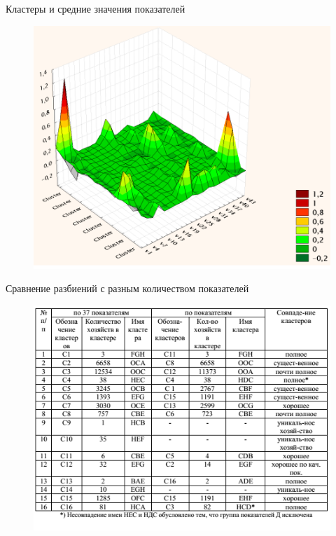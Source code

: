 \documentclass{beamer}
\begin{document}
\begin{frame}
Кластеры и средние значения показателей
\begin{figure}[h]
\centering
\includegraphics[scale=0.5]{images/lec07-pic45.png}
\end{figure}
\end{frame}

\begin{frame}
Сравнение разбиений с разным количеством показателей
\begin{figure}[h]
\centering
\includegraphics[scale=0.75]{images/lec07-pic46.png}
\end{figure}
\end{frame}
\end{document}
